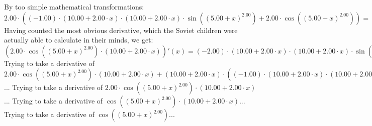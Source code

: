 \documentclass{article}
\begin{document}
\newline
By too simple mathematical transformations:
 ${{2.00} \cdot \left({{\left({-1.00}\right) \cdot {\left({{10.00} + {{2.00} \cdot {x}}}\right) \cdot {\left({{10.00} + {{2.00} \cdot {x}}}\right) \cdot  \sin {\left({\left({{5.00} + {x}}\right) ^ {2.00}}\right)} }}} + {{2.00} \cdot  \cos {\left({\left({{5.00} + {x}}\right) ^ {2.00}}\right)} }}\right)} = {{\left({-2.00}\right) \cdot {\left({{10.00} + {{2.00} \cdot {x}}}\right) \cdot {\left({{10.00} + {{2.00} \cdot {x}}}\right) \cdot  \sin {\left({\left({{5.00} + {x}}\right) ^ {2.00}}\right)} }}} + {{4.00} \cdot  \cos {\left({\left({{5.00} + {x}}\right) ^ {2.00}}\right)} }}$ 
 \newline
 \newline 
Having counted the most obvious derivative, which the Soviet children were actually able to calculate in their minds, we get:
$({{2.00} \cdot { \cos {\left({\left({{5.00} + {x}}\right) ^ {2.00}}\right)}  \cdot \left({{10.00} + {{2.00} \cdot {x}}}\right)}})'(x) = {{\left({-2.00}\right) \cdot {\left({{10.00} + {{2.00} \cdot {x}}}\right) \cdot {\left({{10.00} + {{2.00} \cdot {x}}}\right) \cdot  \sin {\left({\left({{5.00} + {x}}\right) ^ {2.00}}\right)} }}} + {{4.00} \cdot  \cos {\left({\left({{5.00} + {x}}\right) ^ {2.00}}\right)} }}$\newline
\newline
Trying to take a derivative of ${{{2.00} \cdot { \cos {\left({\left({{5.00} + {x}}\right) ^ {2.00}}\right)}  \cdot \left({{10.00} + {{2.00} \cdot {x}}}\right)}} + {\left({{10.00} + {{2.00} \cdot {x}}}\right) \cdot \left({{\left({-1.00}\right) \cdot {\left({{10.00} + {{2.00} \cdot {x}}}\right) \cdot {\left({{10.00} + {{2.00} \cdot {x}}}\right) \cdot  \sin {\left({\left({{5.00} + {x}}\right) ^ {2.00}}\right)} }}} + {{2.00} \cdot  \cos {\left({\left({{5.00} + {x}}\right) ^ {2.00}}\right)} }}\right)}}$...\newline
\newline
Trying to take a derivative of ${{2.00} \cdot { \cos {\left({\left({{5.00} + {x}}\right) ^ {2.00}}\right)}  \cdot \left({{10.00} + {{2.00} \cdot {x}}}\right)}}$...\newline
\newline
Trying to take a derivative of ${ \cos {\left({\left({{5.00} + {x}}\right) ^ {2.00}}\right)}  \cdot \left({{10.00} + {{2.00} \cdot {x}}}\right)}$...\newline
\newline
Trying to take a derivative of $ \cos {\left({\left({{5.00} + {x}}\right) ^ {2.00}}\right)} $...\newline
\end{document}
